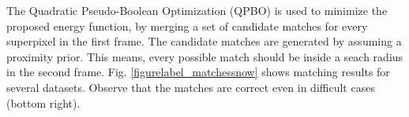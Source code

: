 
The Quadratic Pseudo-Boolean Optimization (QPBO) \cite{c3}\cite{c4} is used to minimize the proposed energy function, 
by merging a set of candidate matches for every superpixel in the first frame. The candidate matches are generated by assuming 
a proximity prior. This means, every possible match should be inside a seach radius in the second frame. Fig. \ref{figurelabel_matchessnow} shows matching results for several datasets. Observe that the matches are correct even in difficult cases (bottom right).
